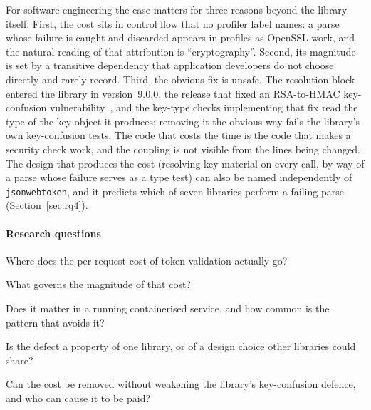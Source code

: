 \documentclass[preprint,12pt,authoryear]{elsarticle}
\newcommand{\LibraryName}{\texttt{jsonwebtoken}}
\begin{document}
For software engineering the case matters for three reasons beyond the
library itself. First, the cost sits in control flow that no profiler label
names: a parse whose failure is caught and discarded appears in profiles as
OpenSSL work, and the natural reading of that attribution is
``cryptography''.
Second, its magnitude is set by a transitive dependency that application
developers do not choose directly and rarely record. Third, the obvious fix is
unsafe. The resolution block entered the library in version~9.0.0, the
release that fixed an RSA-to-HMAC key-confusion
vulnerability~\citep{auth0bulletin2022}, and the key-type checks implementing
that fix read the type of the key object it produces; removing it the obvious
way fails the library's own key-confusion tests. The code that costs the time
is the code that makes a security check work, and the coupling is not visible
from the lines being changed. The design that produces the cost (resolving key
material on every call, by way of a parse whose failure serves as a type test)
can also be named independently of \LibraryName{}, and it predicts which of
seven libraries perform a failing parse (Section~\ref{sec:rq4}).

\paragraph{Research questions}
\begin{list}{}{\setlength{\labelwidth}{2.2em}\setlength{\labelsep}{0.5em}%
  \setlength{\leftmargin}{2.7em}\setlength{\itemsep}{1pt}\setlength{\topsep}{2pt}%
  \setlength{\parsep}{0pt}\renewcommand{\makelabel}[1]{\textbf{#1}\hfill}}
\item[RQ1] Where does the per-request cost of token validation actually go?
\item[RQ2] What governs the magnitude of that cost?
\item[RQ3] Does it matter in a running containerised service, and how common is the
  pattern that avoids it?
\item[RQ4] Is the defect a property of one library, or of a design choice
  other libraries could share?
\item[RQ5] Can the cost be removed without weakening the library's
  key-confusion defence, and who can cause it to be paid?
\end{list}
\end{document}

